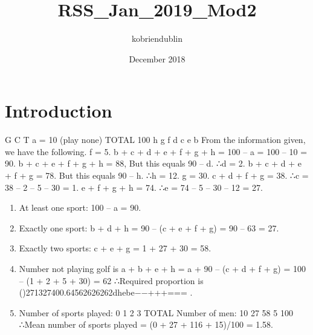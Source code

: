 \documentclass{article}
\title{RSS_Jan_2019_Mod2}
\author{kobriendublin }
\date{December 2018}
\begin{document}

\section{Introduction}

G
C
T
a = 10 (play none)
TOTAL 100
h
g
f
d
c
e
b
From the information given, we have the following.
f = 5.
b + c + d + e + f + g + h = 100 – a = 100 – 10 = 90.
b + c + e + f + g + h = 88, But this equals 90 – d. ∴d = 2.
b + c + d + e + f + g = 78. But this equals 90 – h. ∴h = 12.
g = 30.
c + d + f + g = 38. ∴c = 38 – 2 – 5 – 30 = 1.
e + f + g + h = 74. ∴e = 74 – 5 – 30 – 12 = 27.

\begin{enumerate}
\item At least one sport: 100 – a = 90.
\item Exactly one sport: b + d + h = 90 – (c + e + f + g) = 90 – 63 = 27.
\item Exactly two sports: c + e + g = 1 + 27 + 30 = 58.
\item Number not playing golf is
a + b + e + h = a + 90 – (c + d + f + g) = 100 – (1 + 2 + 5 + 30) = 62
∴Required proportion is ()271327400.64562626262dhebe−−+++=== .
\item 
Number of sports played:
0
1
2
3
TOTAL
Number of men:
10
27
58
5
100
∴Mean number of sports played = (0 + 27 + 116 + 15)/100 = 1.58.
\end{enumerate}
\end{document}
